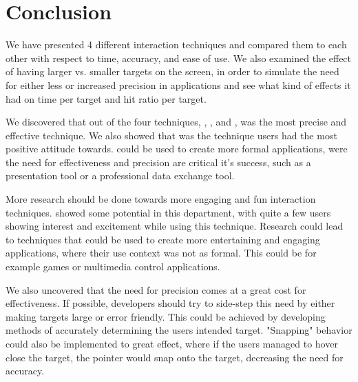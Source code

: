 \section{Conclusion}
We have presented 4 different interaction techniques and compared them to each other with respect to time, accuracy, and ease of use.
We also examined the effect of having larger vs. smaller targets on the screen, in order to simulate the need for either less or increased precision in applications and see what kind of effects it had on time per target and hit ratio per target. 

We discovered that out of the four techniques, \swipe, \throw, \tilt and \pinch, \swipe was the most precise and effective technique. We also showed that \swipe was the technique users had the most positive attitude towards. 
\swipe could be used to create more formal applications, were the need for effectiveness and precision are critical it's success, such as a presentation tool or a professional data exchange tool. 

More research should be done towards more engaging and fun interaction techniques.
\pinch showed some potential in this department, with quite a few users showing interest and excitement while using this technique.
Research could lead to techniques that could be used to create more entertaining and engaging applications, where their use context was not as formal. This could be for example games or multimedia control applications. 

We also uncovered that the need for precision comes at a great cost for effectiveness. 
If possible, developers should try to side-step this need by either making targets large or error friendly.
This could be achieved by developing methods of accurately determining the users intended target.
"Snapping" behavior could also be implemented to great effect, where if the users managed to hover close the target, the pointer would snap onto the target, decreasing the need for accuracy. 
